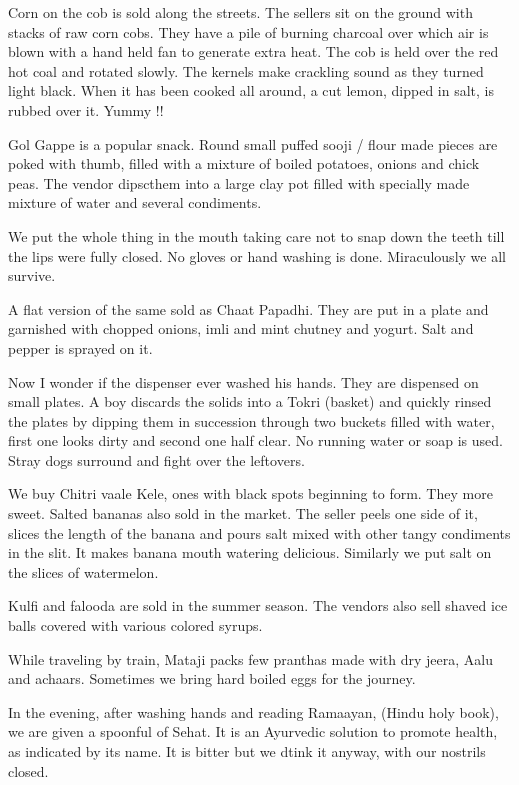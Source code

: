 Corn on the cob is sold along the streets. The sellers sit on the ground
with stacks of raw corn cobs. They have a pile of burning charcoal over
which air is blown with a hand held fan to generate extra heat. The cob is
held over the red hot coal and rotated slowly. The kernels make crackling
sound as they turned light black. When it has been cooked all around,
a cut lemon, dipped in salt, is rubbed over it. Yummy !! 

Gol Gappe is a popular snack. Round small puffed sooji / flour made pieces
are poked with thumb, filled with a mixture of boiled potatoes, onions and
chick peas. The vendor dipscthem into a large clay pot filled with
specially made mixture of water and several condiments. 

We put the whole thing in the mouth taking care not to snap down the teeth
till the lips were fully closed. No gloves or hand washing is done.
Miraculously we all survive. 

A flat version of the same sold as Chaat Papadhi. They are put in a plate
and garnished with chopped onions, imli and mint chutney and yogurt. Salt
and pepper is sprayed on it. 

Now I wonder if the dispenser ever washed his hands. They are dispensed on
small plates. A boy discards the solids into a Tokri (basket) and quickly
rinsed the plates by dipping them in succession through two buckets filled
with water, first one looks dirty and second one half clear. No running
water or soap is used. Stray dogs surround and fight over the leftovers. 

We buy Chitri vaale Kele, ones with black spots beginning to form. They
more sweet. Salted bananas also sold in the market. The seller peels one
side of it, slices the length of the banana and pours salt mixed with
other tangy condiments in the slit. It makes banana mouth watering
delicious. Similarly we put salt on the slices of watermelon. 

Kulfi and falooda are sold in the summer season. The vendors also sell
shaved ice balls covered with various colored syrups. 

While traveling by train, Mataji packs few pranthas made with dry jeera,
Aalu and achaars. Sometimes we bring hard boiled eggs for the journey. 

In the evening, after washing hands and reading Ramaayan, (Hindu holy
book), we are given a spoonful of Sehat. It is an Ayurvedic solution to
promote health, as indicated by its name. It is bitter but we dtink it
anyway, with our nostrils closed. 

